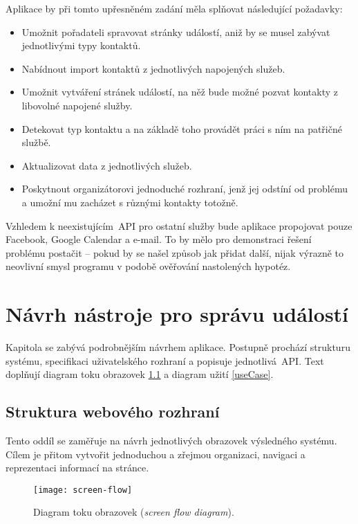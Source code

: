 \documentclass[12pt,oneside,final]{fithesis2}
\begin{document}
Aplikace by při tomto upřesněném zadání měla splňovat následující požadavky:

\begin{itemize}
    \item Umožnit pořadateli spravovat stránky událostí, aniž by se musel zabývat jednotlivými typy kontaktů.
    \item Nabídnout import kontaktů z jednotlivých napojených služeb.
    \item Umožnit vytváření stránek událostí, na něž bude možné pozvat kontakty z libovolné napojené služby.
    \item Detekovat typ kontaktu a na základě toho provádět práci s ním na patřičné službě.
    \item Aktualizovat data z jednotlivých služeb.
    \item Poskytnout organizátorovi jednoduché rozhraní, jenž jej odstíní od problému a umožní mu zacházet s různými kontakty totožně.
\end{itemize}

Vzhledem k neexistujícím~API pro ostatní služby bude aplikace propojovat pouze Facebook, Google Calendar a e-mail. To by mělo pro demonstraci řešení problému postačit -- pokud by se našel způsob jak přidat další, nijak výrazně to neovlivní smysl programu v podobě ověřování nastolených hypotéz.



\chapter{Návrh nástroje pro správu událostí}
Kapitola se zabývá podrobnějším návrhem aplikace. Postupně prochází strukturu systému, specifikaci uživatelského rozhraní a popisuje jednotlivá~API. Text doplňují diagram toku obrazovek \ref{screenFlow} a diagram užití \ref{useCase}.

\section{Struktura webového rozhraní}
Tento oddíl se zaměřuje na návrh jednotlivých obrazovek výsledného systému. Cílem je přitom vytvořit jednoduchou a zřejmou organizaci, navigaci a reprezentaci informací na stránce.

\begin{figure}[p]
    \centering
    \texttt{[image: screen-flow]}
    \caption{Diagram toku obrazovek (\emph{screen flow diagram}).}
    \label{screenFlow}
\end{figure}
\end{document}
